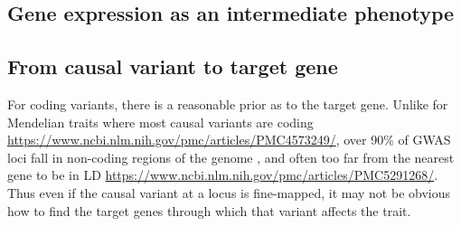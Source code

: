 \begin{outline}
\section{Gene expression as an intermediate phenotype}

\subsection{From causal variant to target gene}

\1 For coding variants, there is a reasonable prior as to the target gene.
\1 Unlike for Mendelian traits where most causal variants are coding \url{https://www.ncbi.nlm.nih.gov/pmc/articles/PMC4573249/}, 
over 90\% of \gls{GWAS} loci fall in non-coding regions of the genome \autocite{gallagher2018PostGWASEraAssociation},
and often too far from the nearest gene to be in \gls{LD} \url{https://www.ncbi.nlm.nih.gov/pmc/articles/PMC5291268/}.
Thus even if the causal variant at a locus is fine-mapped, 
it may not be obvious how to find the target genes through which that variant affects the trait.
%


\end{outline}
